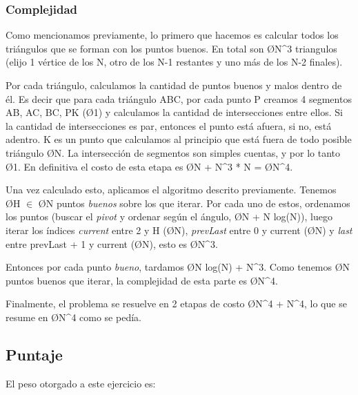 \subsubsection{Complejidad}
Como mencionamos previamente, lo primero que hacemos es calcular todos los triángulos que se forman con los puntos buenos. En total son \O{N^3} triangulos (elijo 1 vértice de los N, otro de los N-1 restantes y uno más de los N-2 finales).

Por cada triángulo, calculamos la cantidad de puntos buenos y malos dentro de él. Es decir que para cada triángulo ABC, por cada punto P creamos 4 segmentos AB, AC, BC, PK (\O{1}) y calculamos la cantidad de intersecciones entre ellos. Si la cantidad de intersecciones es par, entonces el punto está afuera, si no, está adentro. K es un punto que calculamos al principio que está fuera de todo posible triángulo \O{N}. La intersección de segmentos son simples cuentas, y por lo tanto \O{1}. En definitiva el costo de esta etapa es \O{N + N^3 * N} = \O{N^4}.

Una vez calculado esto, aplicamos el algoritmo descrito previamente. Tenemos \O{H} $\in$ \O{N} puntos \textit{buenos} sobre los que iterar. Por cada uno de estos, ordenamos los puntos (buscar el \textit{pivot} y ordenar según el ángulo, \O{N + N log(N)}), luego iterar los índices \textit{current} entre 2 y H (\O{N}), \textit{prevLast} entre 0 y current (\O{N}) y \textit{last} entre prevLast + 1 y current (\O{N}), esto es \O{N^3}.

Entonces por cada punto \textit{bueno}, tardamos \O{N log(N) + N^3}. Como tenemos \O{N} puntos buenos que iterar, la complejidad de esta parte es \O{N^4}.

Finalmente, el problema se resuelve en 2 etapas de costo \O{N^4 + N^4}, lo que se resume en \O{N^4} como se pedía.

\subsection{Puntaje}
El peso otorgado a este ejercicio es:
